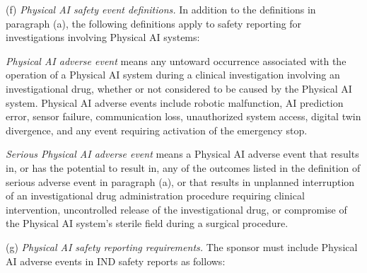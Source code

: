 \documentclass[11pt]{article}
\begin{document}
(f) \textit{Physical AI safety event definitions.} In addition to the definitions in paragraph (a), the following definitions apply to safety reporting for investigations involving Physical AI systems:

\textit{Physical AI adverse event} means any untoward occurrence associated with the operation of a Physical AI system during a clinical investigation involving an investigational drug, whether or not considered to be caused by the Physical AI system. Physical AI adverse events include robotic malfunction, AI prediction error, sensor failure, communication loss, unauthorized system access, digital twin divergence, and any event requiring activation of the emergency stop.

\textit{Serious Physical AI adverse event} means a Physical AI adverse event that results in, or has the potential to result in, any of the outcomes listed in the definition of serious adverse event in paragraph (a), or that results in unplanned interruption of an investigational drug administration procedure requiring clinical intervention, uncontrolled release of the investigational drug, or compromise of the Physical AI system's sterile field during a surgical procedure.

(g) \textit{Physical AI safety reporting requirements.} The sponsor must include Physical AI adverse events in IND safety reports as follows:
\end{document}
